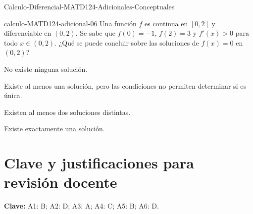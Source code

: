 \documentclass[10pt]{article}
\begin{document}
\begin{quiz}{Calculo-Diferencial-MATD124-Adicionales-Conceptuales}
\begin{multi}[single=true,shuffle=false]{calculo-MATD124-adicional-06}
Una función $f$ es continua en $[0,2]$ y diferenciable en $(0,2)$.
Se sabe que $f(0)=-1$, $f(2)=3$ y $f'(x)>0$ para todo $x\in(0,2)$.
¿Qué se puede concluir sobre las soluciones de $f(x)=0$ en $(0,2)$?
    \item[fraction=0] No existe ninguna solución.
    \item[fraction=0] Existe al menos una solución, pero las condiciones
    no permiten determinar si es única.
    \item[fraction=0] Existen al menos dos soluciones distintas.
    \item* Existe exactamente una solución.
\end{multi}

\end{quiz}

\clearpage
\section*{Clave y justificaciones para revisión docente}
\textbf{Clave:} A1: B; A2: D; A3: A; A4: C; A5: B; A6: D.
\end{document}
